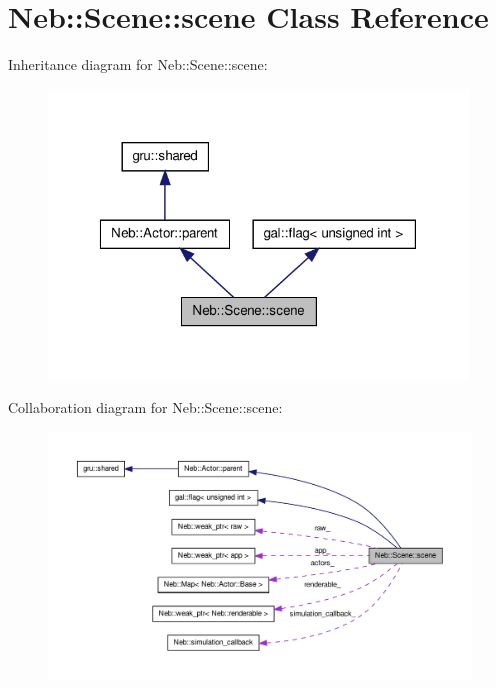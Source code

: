 \hypertarget{classNeb_1_1Scene_1_1scene}{\section{\-Neb\-:\-:\-Scene\-:\-:scene \-Class \-Reference}
\label{classNeb_1_1Scene_1_1scene}
}


\-Inheritance diagram for \-Neb\-:\-:\-Scene\-:\-:scene\-:\nopagebreak
\begin{figure}[H]
\begin{center}
\leavevmode
\includegraphics[width=316pt]{classNeb_1_1Scene_1_1scene__inherit__graph}
\end{center}
\end{figure}


\-Collaboration diagram for \-Neb\-:\-:\-Scene\-:\-:scene\-:\nopagebreak
\begin{figure}[H]
\begin{center}
\leavevmode
\includegraphics[width=350pt]{classNeb_1_1Scene_1_1scene__coll__graph}
\end{center}
\end{figure}

